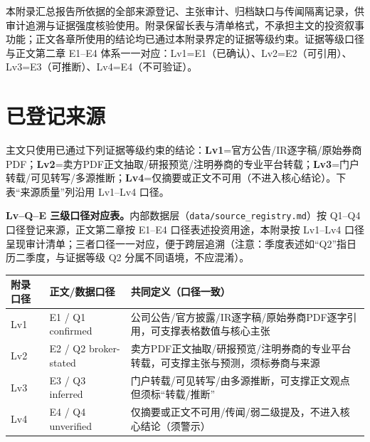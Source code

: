 本附录汇总报告所依据的全部来源登记、主张审计、归档缺口与传闻隔离记录，供审计追溯与证据强度核验使用。附录保留长表与清单格式，不承担主文的投资叙事功能；正文各章所使用的结论均已通过本附录界定的证据等级约束。证据等级口径与正文第二章 E1--E4 体系一一对应：Lv1=E1（已确认）、Lv2=E2（可引用）、Lv3=E3（可推断）、Lv4=E4（不可验证）。

\renewcommand{\thetable}{\arabic{chapter}-\arabic{table}}

\section{已登记来源}

\begin{sourcequalitybox}[证据等级口径说明]
主文只使用已通过下列证据等级约束的结论：\textbf{Lv1}=官方公告/IR逐字稿/原始券商PDF；\textbf{Lv2}=卖方PDF正文抽取/研报预览/注明券商的专业平台转载；\textbf{Lv3}=门户转载/可见转写/多源推断；\textbf{Lv4}=仅摘要或正文不可用（不进入核心结论）。下表``来源质量''列沿用 Lv1--Lv4 口径。

\noindent\textbf{Lv--Q--E 三级口径对应表。}内部数据层（\texttt{data/source\_registry.md}）按 Q1--Q4 口径登记来源，正文第二章按 E1--E4 口径表述投资用途，本附录按 Lv1--Lv4 口径呈现审计清单；三者口径一一对应，便于跨层追溯（注意：季度表述如``Q2''指日历二季度，与证据等级 Q2 分属不同语境，不应混淆）。

\begin{center}\footnotesize
\begin{tabularx}{\textwidth}{L{1.4cm}L{1.6cm}X}
\toprule
\textbf{附录口径} & \textbf{正文/数据口径} & \textbf{共同定义（口径一致）} \\
\midrule
Lv1 & E1 / Q1 confirmed & 公司公告/官方披露/IR逐字稿/原始券商PDF逐字引用，可支撑表格数值与核心主张 \\
Lv2 & E2 / Q2 broker-stated & 卖方PDF正文抽取/研报预览/注明券商的专业平台转载，可支撑主张与预测，须标券商与来源 \\
Lv3 & E3 / Q3 inferred & 门户转载/可见转写/由多源推断，可支撑正文观点但须标``转载/推断'' \\
Lv4 & E4 / Q4 unverified & 仅摘要或正文不可用/传闻/弱二级提及，不进入核心结论（须警示） \\
\bottomrule
\end{tabularx}
\end{center}
\end{sourcequalitybox}

